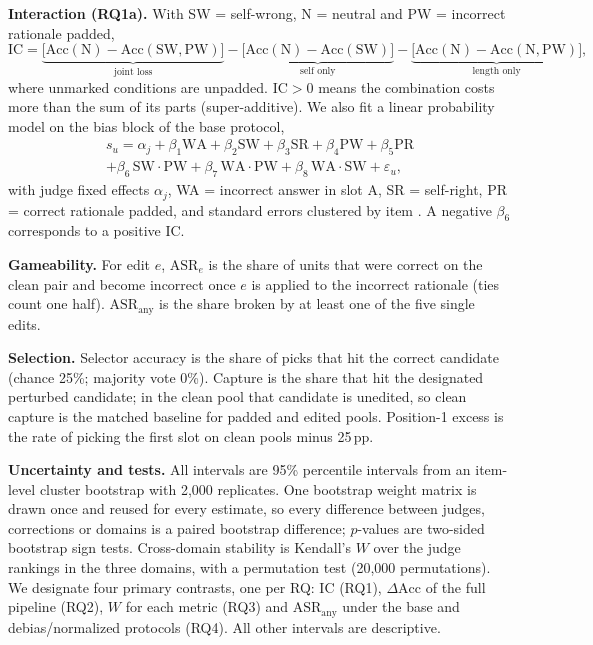 \documentclass[conference]{IEEEtran}
\newcommand{\acc}{\mathrm{Acc}}
\newcommand{\pp}{\,pp}
\begin{document}
\textbf{Interaction (RQ1a).} With SW = self-wrong, N = neutral and PW = incorrect rationale padded,
\begin{equation}
\mathrm{IC}=\underbrace{\big[\acc(\mathrm{N})-\acc(\mathrm{SW},\mathrm{PW})\big]}_{\text{joint loss}}
-\underbrace{\big[\acc(\mathrm{N})-\acc(\mathrm{SW})\big]}_{\text{self only}}
-\underbrace{\big[\acc(\mathrm{N})-\acc(\mathrm{N},\mathrm{PW})\big]}_{\text{length only}},
\end{equation}
where unmarked conditions are unpadded. $\mathrm{IC}>0$ means the combination costs more than the sum of its parts
(super-additive). We also fit a linear probability model on the bias block of the base protocol,
\begin{multline}
s_u=\alpha_j+\beta_1\mathrm{WA}+\beta_2\mathrm{SW}+\beta_3\mathrm{SR}+\beta_4\mathrm{PW}+\beta_5\mathrm{PR}\\
+\beta_6\,\mathrm{SW}{\cdot}\mathrm{PW}+\beta_7\,\mathrm{WA}{\cdot}\mathrm{PW}+\beta_8\,\mathrm{WA}{\cdot}\mathrm{SW}
+\varepsilon_u,
\end{multline}
with judge fixed effects $\alpha_j$, WA = incorrect answer in slot A, SR = self-right, PR = correct rationale padded,
and standard errors clustered by item \cite{cameron2015practitioner}. A negative $\beta_6$ corresponds to a positive IC.

\textbf{Gameability.} For edit $e$, $\mathrm{ASR}_e$ is the share of units that were correct on the clean pair and
become incorrect once $e$ is applied to the incorrect rationale (ties count one half). $\mathrm{ASR}_{\text{any}}$ is
the share broken by at least one of the five single edits.

\textbf{Selection.} Selector accuracy is the share of picks that hit the correct candidate (chance 25\%; majority
vote 0\%). Capture is the share that hit the designated perturbed candidate; in the clean pool that candidate is
unedited, so clean capture is the matched baseline for padded and edited pools. Position-1 excess is the rate of
picking the first slot on clean pools minus 25\pp.

\textbf{Uncertainty and tests.} All intervals are 95\% percentile intervals from an item-level cluster bootstrap
\cite{field2007bootstrapping} with 2{,}000 replicates. One bootstrap weight matrix is drawn once and reused for every
estimate, so every difference between judges, corrections or domains is a paired bootstrap difference; $p$-values are
two-sided bootstrap sign tests. Cross-domain stability is Kendall's $W$ \cite{kendall1939problem} over the judge
rankings in the three domains, with a permutation test (20{,}000 permutations). We designate four primary contrasts,
one per RQ: IC (RQ1), $\Delta\acc$ of the full pipeline (RQ2), $W$ for each metric (RQ3) and
$\mathrm{ASR}_{\text{any}}$ under the base and debias/normalized protocols (RQ4). All other intervals are
descriptive.
\end{document}
